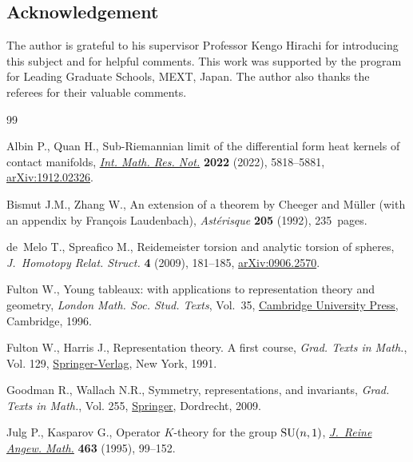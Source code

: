 \documentclass[10pt,a4paper]{amsart}
\numberwithin{equation}{section}
\begin{document}
\subsection*{Acknowledgement}
The author is grateful to his supervisor Professor Kengo Hirachi for introducing this subject and for helpful comments.
This work was supported by the program for Leading Graduate Schools, MEXT, Japan.
The author also thanks the referees for their valuable comments.


%
%


\begin{thebibliography}{99}
\footnotesize\itemsep=0pt

Albin P., Quan H., Sub-{R}iemannian limit of the differential form heat kernels
 of contact manifolds, \href{https://doi.org/10.1093/imrn/rnaa270}{\textit{Int. Math. Res. Not.}} \textbf{2022} (2022),
 5818--5881, \href{http://arxiv.org/abs/1912.02326}{arXiv:1912.02326}.

Bismut J.M., Zhang W., An extension of a theorem by {C}heeger and {M}\"{u}ller
 (with an appendix by Fran\c{c}ois Laudenbach), \textit{Ast\'{e}risque}
 \textbf{205} (1992), 235~pages.

de~Melo T., Spreafico M., Reidemeister torsion and analytic torsion of spheres,
 \textit{J.~Homotopy Relat. Struct.} \textbf{4} (2009), 181--185,
 \href{http://arxiv.org/abs/0906.2570}{arXiv:0906.2570}.

Fulton W., Young tableaux: with applications to representation theory and
 geometry, \textit{London Math. Soc. Stud. Texts}, Vol.~35, \href{https://doi.org/10.1017/CBO9780511626241}{Cambridge
 University Press}, Cambridge, 1996.

Fulton W., Harris J., Representation theory. A first course, \textit{Grad.
 Texts in Math.}, Vol. 129, \href{https://doi.org/10.1007/978-1-4612-0979-9}{Springer-Verlag}, New York, 1991.

Goodman R., Wallach N.R., Symmetry, representations, and invariants,
 \textit{Grad. Texts in Math.}, Vol. 255, \href{https://doi.org/10.1007/978-0-387-79852-3}{Springer}, Dordrecht, 2009.

Julg P., Kasparov G., Operator {$K$}-theory for the group {${\rm SU}(n,1)$},
 \href{https://doi.org/10.1515/crll.1995.463.99}{\textit{J.~Reine Angew. Math.}} \textbf{463} (1995), 99--152.


\end{thebibliography}
\end{document}
